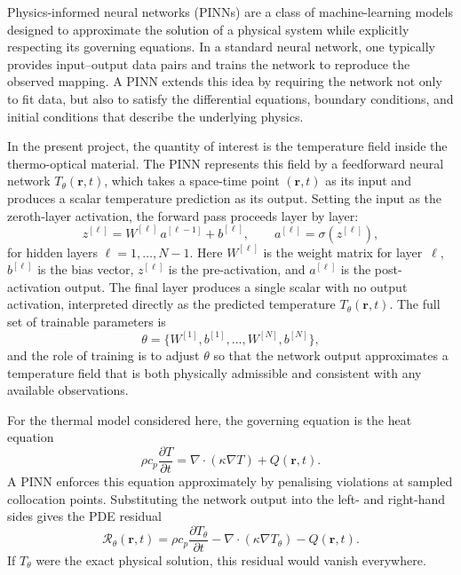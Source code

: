 \documentclass[11pt,letterpaper]{article}
\begin{document}
Physics-informed neural networks (PINNs) are a class of machine-learning models designed to
approximate the solution of a physical system while explicitly respecting its governing equations.
In a standard neural network, one typically provides input--output data pairs and trains the network
to reproduce the observed mapping. A PINN extends this idea by requiring the network not only to
fit data, but also to satisfy the differential equations, boundary conditions, and initial conditions
that describe the underlying physics.

In the present project, the quantity of interest is the temperature field inside the thermo-optical
material. The PINN represents this field by a feedforward neural network $T_\theta(\mathbf{r},t)$,
which takes a space-time point $(\mathbf{r},t)$ as its input and produces a scalar temperature
prediction as its output. Setting the input as the zeroth-layer activation, the forward pass
proceeds layer by layer:
\begin{equation}
z^{[\ell]} = W^{[\ell]}\,a^{[\ell-1]} + b^{[\ell]},
\qquad
a^{[\ell]} = \sigma\!\left(z^{[\ell]}\right),
\end{equation}
for hidden layers $\ell = 1, \dots, N-1$. Here $W^{[\ell]}$ is the weight matrix for layer~$\ell$,
$b^{[\ell]}$ is the bias vector, $z^{[\ell]}$ is the pre-activation, and $a^{[\ell]}$ is the
post-activation output. The final layer produces a single scalar with no output activation,
interpreted directly as the predicted temperature $T_\theta(\mathbf{r},t)$. The full set of
trainable parameters is
\begin{equation}
\theta = \{W^{[1]}, b^{[1]}, \dots, W^{[N]}, b^{[N]}\},
\end{equation}
and the role of training is to adjust $\theta$ so that the network output approximates a temperature
field that is both physically admissible and consistent with any available observations.

For the thermal model considered here, the governing equation is the heat equation
\begin{equation}
\rho c_p \frac{\partial T}{\partial t}
=
\nabla \cdot (\kappa \nabla T) + Q(\mathbf{r},t).
\end{equation}
A PINN enforces this equation approximately by penalising violations at sampled collocation points.
Substituting the network output into the left- and right-hand sides gives the PDE residual
\begin{equation}
\mathcal{R}_\theta(\mathbf{r},t)
=
\rho c_p \frac{\partial T_\theta}{\partial t}
-
\nabla \cdot (\kappa \nabla T_\theta)
-
Q(\mathbf{r},t).
\end{equation}
If $T_\theta$ were the exact physical solution, this residual would vanish everywhere.
\end{document}
